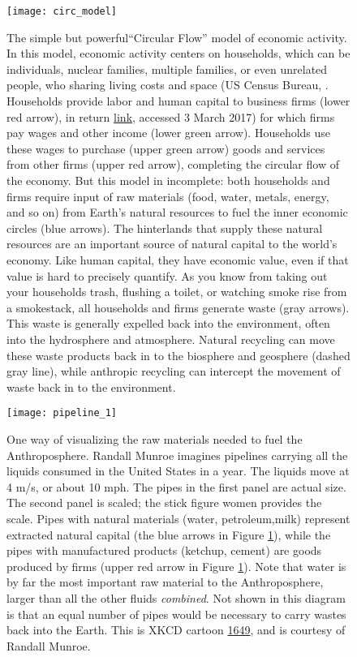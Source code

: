 \documentclass[amstex,12pt]{book}
\begin{document}
\newpage
\begin{figure}[p]
\centering
  \texttt{[image: circ\_model]}%
\caption{The simple but powerful``Circular Flow'' model of economic activity. In this model, economic activity centers on households, which can be individuals, nuclear families, multiple families, or even unrelated people, who sharing living costs and space (US Census Bureau, . Households provide labor and human capital to business firms (lower red arrow), in return \href{https://www.census.gov/quickfacts/table/PST045216/00}{link}, accessed 3 March 2017) for which firms pay wages and other income (lower green arrow). Households use these wages to purchase (upper green arrow) goods and services from other firms (upper red arrow), completing the circular flow of the economy. But this model in incomplete: both households and firms require input of raw materials (food, water, metals, energy, and so on) from Earth's natural resources to fuel the inner economic circles (blue arrows). The hinterlands that supply these natural resources are an important source of natural capital to the world's economy. Like human capital, they have economic value, even if that value is hard to precisely quantify. As you know from taking out your households trash, flushing a toilet, or watching smoke rise from a smokestack, all households and firms generate waste (gray arrows). This waste is generally expelled back into the environment, often into the hydrosphere and atmosphere. Natural recycling can move these waste products back in to the biosphere and geosphere (dashed gray line), while anthropic recycling can intercept the movement of waste back in to the environment.} 

\label{fig:circ_flow}
\end{figure}


\newpage
\begin{figure}[p]
\centering
  \texttt{[image: pipeline\_1]}%

\caption{One way of visualizing the raw materials needed to fuel the Anthroposphere. Randall Munroe imagines pipelines carrying all the liquids consumed in the United States in a year. The liquids move at 4 m/s, or about 10 mph. The pipes in the first panel are actual size. The second panel is scaled; the stick figure women provides the scale. Pipes with natural materials (water, petroleum,milk) represent extracted natural capital (the blue arrows in Figure \ref{fig:circ_flow}), while the pipes with manufactured products (ketchup, cement) are goods produced by firms (upper red arrow in Figure \ref{fig:circ_flow}). Note that water is by far the most important raw material to the Anthroposphere, larger than all the other fluids \emph{combined}. Not shown in this diagram is that an equal number of pipes would be necessary to carry wastes back into the Earth. This is XKCD cartoon \href{https://xkcd.com/1649/}{1649}, and is courtesy of Randall Munroe.}

\label{fig:pipelines}
\end{figure}
\end{document}
